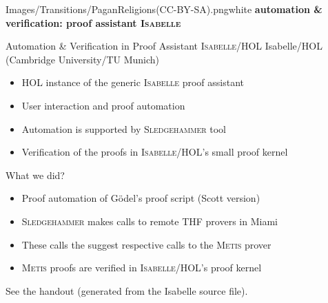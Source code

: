 
\begin{transitionframe}{Images/Transitions/PaganReligions(CC-BY-SA).png}{white} \Large \centering
\textbf{automation \& verification: proof assistant \textsc{Isabelle}}
\end{transitionframe}



\begin{frame}{Automation \& Verification in Proof Assistant \textsc{Isabelle/HOL}} \large
Isabelle/HOL   (Cambridge University/TU Munich)
\begin{itemize}
\item HOL instance of the generic \textsc{Isabelle} proof assistant
\item User interaction and proof automation 
\item Automation is supported by \textsc{Sledgehammer} tool
\item Verification of the proofs in \textsc{Isabelle/HOL}'s small proof kernel
\end{itemize}
\vfill
What we did?
\begin{itemize}
\item Proof automation of G\"odel's proof script (Scott version)
\item \textsc{Sledgehammer} makes calls to remote THF provers in Miami
\item These calls the suggest respective calls to the \textsc{Metis} prover
\item \textsc{Metis} proofs are verified in \textsc{Isabelle/HOL}'s proof kernel
\end{itemize}
\vfill
See the handout (generated from the Isabelle source file).
\end{frame}


